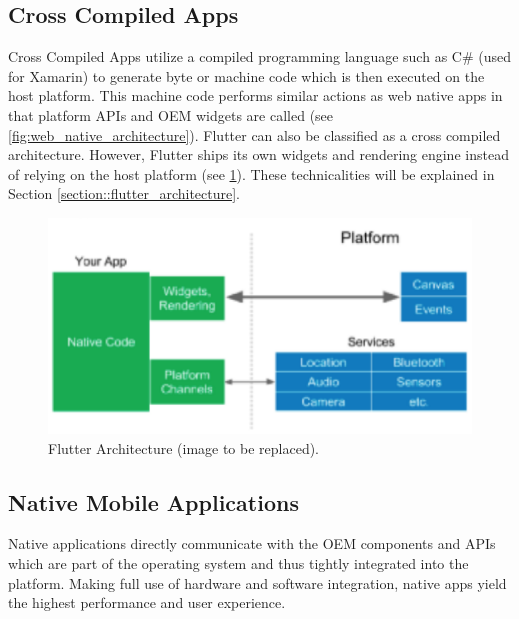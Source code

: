 \subsection{Cross Compiled Apps}
Cross Compiled Apps utilize a compiled programming language such as C\# (used for Xamarin) to generate byte or machine code which is then executed 
on the host platform. This machine code performs similar actions as web native apps in that platform APIs and OEM widgets are called (see \ref{fig:web_native_architecture}).
Flutter can also be classified as a cross compiled architecture. However, Flutter ships its own widgets and rendering engine instead of relying on
the host platform (see \ref{fig:flutter_architecture}). These technicalities will be explained in Section \ref{section::flutter_architecture}.

\begin{figure}
    \includegraphics[width=\linewidth]{images/architectures/flutter_architecture.eps}
    \caption{Flutter Architecture (image to be replaced).}
    \label{fig:flutter_architecture}
\end{figure}

\subsection{Native Mobile Applications}
Native applications directly communicate with the OEM components and APIs which are part of the operating system and thus tightly integrated into the platform.
Making full use of hardware and software integration, native apps yield the highest performance and user experience.

